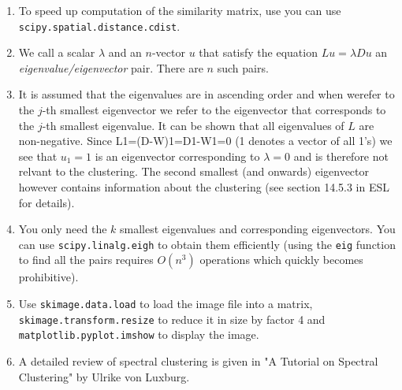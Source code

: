 \documentclass[11pt]{article}
\begin{document}
\begin{enumerate}
\def\labelenumi{\arabic{enumi})}
\item
  To speed up computation of the similarity matrix, use you can use
  \texttt{scipy.spatial.distance.cdist}.
\item
  We call a scalar \(\lambda\) and an \(n\)-vector \(u\) that satisfy
  the equation \(Lu=\lambda Du\) an \emph{eigenvalue/eigenvector} pair.
  There are \(n\) such pairs.
\item
  It is assumed that the eigenvalues are in ascending order and when
  werefer to the \(j\)-th smallest eigenvector we refer to the
  eigenvector that corresponds to the \(j\)-th smallest eigenvalue. It
  can be shown that all eigenvalues of \(L\) are non-negative. Since
  L1=(D-W)1=D1-W1=0 (1 denotes a vector of all 1's) we see that
  \(u_1=1\) is an eigenvector corresponding to \(\lambda=0\) and is
  therefore not relvant to the clustering. The second smallest (and
  onwards) eigenvector however contains information about the clustering
  (see section 14.5.3 in ESL for details).
\item
  You only need the \(k\) smallest eigenvalues and corresponding
  eigenvectors. You can use \texttt{scipy.linalg.eigh} to obtain them
  efficiently (using the \texttt{eig} function to find all the pairs
  requires \(O(n^3)\) operations which quickly becomes prohibitive).
\item
  Use \texttt{skimage.data.load} to load the image file into a matrix,
  \texttt{skimage.transform.resize} to reduce it in size by factor 4 and
  \texttt{matplotlib.pyplot.imshow} to display the image.
\item
  A detailed review of spectral clustering is given in "A Tutorial on
  Spectral Clustering" by Ulrike von Luxburg.
\end{enumerate}
\end{document}
